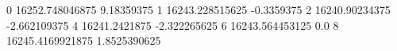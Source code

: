 0 16252.748046875 9.18359375
1 16243.228515625 -0.3359375
2 16240.90234375 -2.662109375
4 16241.2421875 -2.322265625
6 16243.564453125 0.0
8 16245.4169921875 1.8525390625
